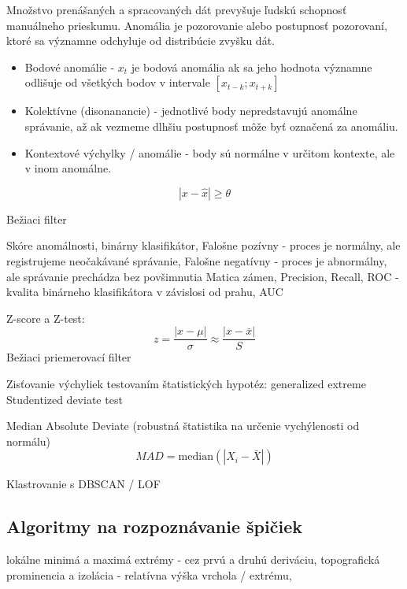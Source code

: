 \cite{survey-univariate-time-series} 
Množstvo prenášaných a spracovaných dát prevyšuje ľudskú schopnosť manuálneho prieskumu. Anomália je pozorovanie alebo postupnosť pozorovaní, ktoré sa významne odchyluje od distribúcie zvyšku dát. 
\begin{itemize}
	\item Bodové anomálie - $x_t$ je bodová anomália ak sa jeho hodnota významne odlišuje od všetkých 		
		bodov v intervale $ [x_{t-k}; x_{t+k}] $
	\item Kolektívne (disonanancie) - jednotlivé body nepredstavujú anomálne správanie, až ak vezmeme dlhšiu postupnosť môže byť označená za anomáliu.
	\item Kontextové výchylky / anomálie - body sú normálne v určitom kontexte, ale v inom anomálne.
\end{itemize}		

\cite{review-outlier-datection} \cite{anomaly-detection-algorithms}
\begin{equation}
|x - \hat{x}| \geq \theta 
\end{equation}

Bežiaci filter  
\cite{anomaly-detection-models}

Skóre anomálnosti, 	binárny klasifikátor, 
Falošne pozívny - proces je normálny, ale registrujeme neočakávané správanie, 
Falošne negatívny - proces je abnormálny, ale správanie prechádza bez povšimnutia
Matica zámen, Precision, Recall, 
ROC - kvalita binárneho klasifikátora v závislosi od prahu, AUC
\cite{wsn-outlier-detection-survey}

Z-score a Z-test: 
\begin{equation}
z = \frac{|x - \mu|}{\sigma} \approx \frac{|x - \bar{x}|}{S}
\end{equation}
Bežiaci priemerovací filter \cite{anomaly-detection-models}

Zisťovanie výchyliek testovaním štatistických hypotéz: 
generalized extreme Studentized deviate test \cite{generalized-esd} 

Median Absolute Deviate (robustná štatistika na určenie vychýlenosti od normálu)
\begin{equation}
MAD = \mathrm{median}(|X_i - \bar{X}|)
\end{equation}

Klastrovanie s DBSCAN / LOF
\cite{change-theory}

\subsection{Algoritmy na rozpoznávanie špičiek}
lokálne minimá a maximá extrémy - cez prvú a druhú deriváciu,
topografická prominencia a izolácia - relatívna výška vrchola / extrému, 

